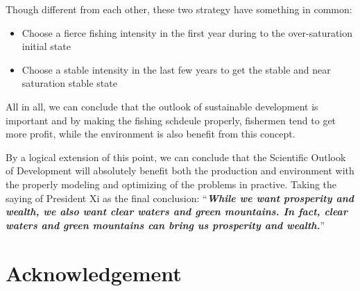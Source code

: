 \documentclass{IEEEtran}
\begin{document}
Though different from each other, these two strategy have something in common:

\begin{itemize}
    \item {Choose a fierce fishing intensity in the first year during to the over-saturation initial state}
    \item {Choose a stable intensity in the last few years to get the stable and near saturation stable state}
\end{itemize}

All in all, we can conclude that the outlook of sustainable development is important and by making the fishing schdeule properly, fishermen tend to get more profit, while the environment is also benefit from this concept.

By a logical extension of this point, we can conclude that the Scientific Outlook of Development will absolutely benefit both the production and environment with the properly modeling and optimizing of the problems in practive. Taking the saying of President Xi as the final conclusion: ``\textbf{\textit{While we want prosperity and wealth, we also want clear waters and green mountains. In fact, clear waters and green mountains can bring us prosperity and wealth.}}''

\section*{Acknowledgement}


\end{document}
